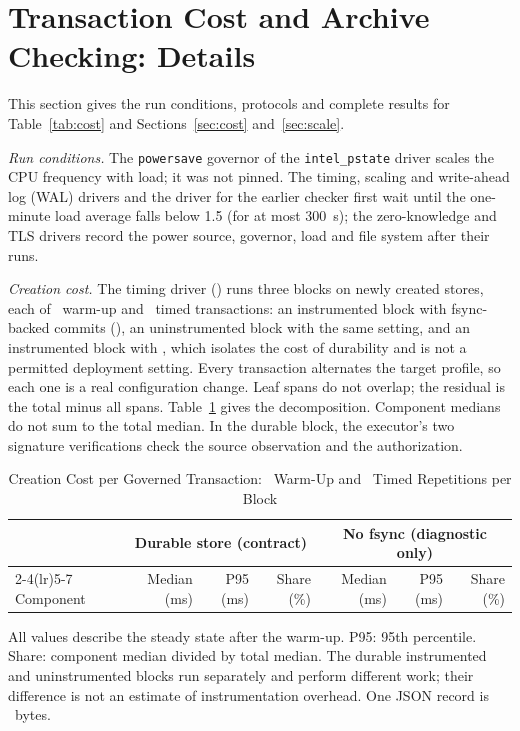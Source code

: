 \section{Transaction Cost and Archive Checking: Details}
\label{s:costs}
This section gives the run conditions, protocols and complete results for Table~\ref{tab:cost} and Sections~\ref{sec:cost} and~\ref{sec:scale}.

\emph{Run conditions.} The \texttt{powersave} governor of the \texttt{intel\_pstate} driver scales the CPU frequency with load; it was not pinned. The timing, scaling and write-ahead log (WAL) drivers and the driver for the earlier checker first wait until the one-minute load average falls below 1.5 (for at most 300~s); the zero-knowledge and TLS drivers record the power source, governor, load and file system after their runs.

\emph{Creation cost.} The timing driver () runs three blocks on newly created stores, each of \TimWarmup\ warm-up and \TimTimed\ timed transactions: an instrumented block with fsync-backed commits (), an uninstrumented block with the same setting, and an instrumented block with , which isolates the cost of durability and is not a permitted deployment setting. Every transaction alternates the target profile, so each one is a real configuration change. Leaf spans do not overlap; the residual is the total minus all spans. Table~\ref{tab:timing} gives the decomposition. Component medians do not sum to the total median. In the durable block, the executor's two signature verifications check the source observation and the authorization.

\begin{table}[!t]
\caption{Creation Cost per Governed Transaction: \TimWarmup\ Warm-Up and \TimTimed\ Timed Repetitions per Block}
\label{tab:timing}
\centering
\begin{tabular}{lrrrrrr}
\toprule
 & \multicolumn{3}{c}{Durable store (contract)} & \multicolumn{3}{c}{No fsync (diagnostic only)} \\
\cmidrule(lr){2-4}\cmidrule(lr){5-7}
Component & Median (ms) & P95 (ms) & Share (\%) & Median (ms) & P95 (ms) & Share (\%) \\
\midrule

\end{tabular}
\par\smallskip\parbox{\linewidth}{\footnotesize All values describe the steady state after the warm-up. P95: 95th percentile. Share: component median divided by total median. The durable instrumented and uninstrumented blocks run separately and perform different work; their difference is not an estimate of instrumentation overhead. One JSON record is \RecordBytes\ bytes.}
\end{table}

